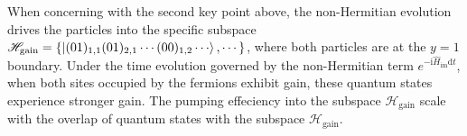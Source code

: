 \documentclass[longbibliography, aps, prx, amsmath, amssymb, amsfonts, twocolumn,superscriptaddress, footinbib]{revtex4-1}
\begin{document}
	When concerning with the second key point above,
	the non-Hermitian evolution drives the particles into the specific subspace
			$\mathscr{H}_{\text{gain}}=\left\{ \ket{(01)_{1,1}(01)_{2,1}\cdots(00)_{1,2}\cdots}, 
            \cdots \right\}$,
	where both particles are at the $y=1$ boundary.
	Under the time evolution governed by the non-Hermitian term $e^{-\mathrm{i}\hat{H}_{\text{im}} \mathrm{d}t}$, when both sites occupied by the fermions exhibit gain, these quantum states experience stronger gain. 
	The pumping effeciency into the subspace $\mathscr{H}_{\text{gain}}$ 
	scale with the overlap of quantum states with the subspace $\mathscr{H}_{\text{gain}}$. 
\end{document}
